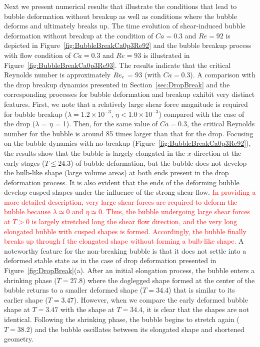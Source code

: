 \documentclass{elsarticle}
\begin{document}
%
Next we present numerical results that illustrate the conditions that lead to
bubble deformation without breakup as well as conditions where the bubble
deforms and ultimately breaks up.  The time evolution of shear-induced bubble
deformation without breakup at the condition of $Ca=0.3$ and $Re=92$ is
depicted in Figure~\ref{fig:BubbleBreakCa0p3Re92} and the bubble breakup
process with flow condition of $Ca=0.3$ and $Re=93$ is illustrated in
Figure~\ref{fig:BubbleBreakCa0p3Re93}.  The results indicate that the critical
Reynolds number is approximately $Re_{\rm c}$ = 93 (with $Ca=0.3$).  A comparison
with the drop breakup dynamics presented in Section~\ref{sec:DropBreak} and the
corresponding processes for bubble deformation and breakup exhibit very
distinct features.  First, we note that a relatively large shear force
magnitude is required for bubble breakup 
($\lambda = 1.2 \times 10^{-3}$, $\eta < 1.0 \times 10^{-3}$) 
compared with the case of the drop ($\lambda$ = $\eta$ = 1). Then,
for the same value of $Ca=0.3$, the critical Reynolds number for the bubble is
around 85 times larger than that for the drop.  Focusing on the bubble dynamics
with no-breakup (Figure~\ref{fig:BubbleBreakCa0p3Re92}), the results show that
the bubble is largely elongated in the $x$-direction at the early stages ($T
\leq 24.3$) of bubble deformation, but the bubble does not develop the
bulb-like shape (large volume areas) at both ends present in the drop
deformation process.  It is also evident that the ends of the deforming bubble
develop cusped shapes under the influence of the strong shear flow.
\textcolor{red}
{
In providing a more detailed description, very large shear forces are required to deform the bubble 
because $\lambda \simeq 0$ and $\eta \simeq 0$.
Thus, the bubble undergoing large shear forces at $T > 0$ is largely stretched long the shear flow direction, 
and the very long elongated bubble with cusped shapes is formed. 
Accordingly, the bubble finally breaks up through f the elongated shape without forming a bulb-like shape.
}
A noteworthy feature for the non-breaking bubble is that it does not settle into
a deformed stable state as in the case of drop deformation presented in
Figure~\ref{fig:DropBreak}(a).  After an initial elongation process, the bubble
enters a shrinking phase ($T = 27.8$) where the doglegged shape formed at the
center of the bubble returns to a smaller deformed shape ($T = 34.4$) that is
similar to its earlier shape ($T=3.47$).  However, when we compare the early
deformed bubble shape at $T = 3.47$ with the shape at $T = 34.4$, it is clear
that the shapes are not identical.  Following the shrinking phase, the bubble
begins to stretch again ($T = 38.2$) and the bubble oscillates between its
elongated shape and shortened geometry.  
\end{document}
